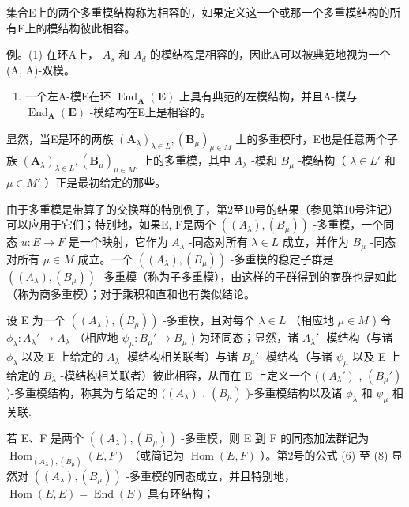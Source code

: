 集合E上的两个多重模结构称为相容的，如果定义这一个或那一个多重模结构的所有E上的模结构彼此相容。

例。(1) 在环A上， \(A_{s}\) 和 \(A_{d}\) 的模结构是相容的，因此A可以被典范地视为一个(A, A)-双模。

\begin{enumerate}
\def\labelenumi{(\arabic{enumi})}
\setcounter{enumi}{1}
\tightlist
\item
  一个左A-模E在环 \(\operatorname{End}_{\mathbf{A}}(\mathbf{E})\) 上具有典范的左模结构，并且A-模与 \(\operatorname{End}_{\mathbf{A}}(\mathbf{E})\) -模结构在E上是相容的。
\end{enumerate}

显然，当E是环的两族 \((\mathbf{A}_{\lambda})_{\lambda\in L},(\mathbf{B}_{\mu})_{\mu\in M}\) 上的多重模时，E也是任意两个子族 \((\mathbf{A}_{\lambda})_{\lambda\in L},(\mathbf{B}_{\mu})_{\mu\in M'}\) 上的多重模，其中 \(A_{\lambda}\) -模和 \(B_{\mu}\) -模结构（ \(\lambda\in L'\) 和 \(\mu\in M'\) ）正是最初给定的那些。

由于多重模是带算子的交换群的特别例子，第2至10号的结果（参见第10号注记）可以应用于它们；特别地，如果E, F是两个 \(((A_{\lambda}), (B_{\mu}))\) -多重模，一个同态 \(u: E \to F\) 是一个映射，它作为 \(A_{\lambda}\) -同态对所有 \(\lambda \in L\) 成立，并作为 \(B_{\mu}\) -同态对所有 \(\mu \in M\) 成立。一个 \(((A_{\lambda}), (B_{\mu}))\) -多重模的稳定子群是 \(((A_{\lambda}), (B_{\mu}))\) -多重模（称为子多重模），由这样的子群得到的商群也是如此（称为商多重模）；对于乘积和直和也有类似结论。

设 E 为一个 \(((A_{\lambda}), (B_{\mu}))\) -多重模，且对每个 \(\lambda \in L\) （相应地 \(\mu \in M\) ) 令 \(\phi_{\lambda}: A_{\lambda}' \to A_{\lambda}\) （相应地 \(\psi_{\mu}: B_{\mu}' \to B_{\mu}\) ) 为环同态；显然，诸 \(A_{\lambda}'\) -模结构（与诸 \(\phi_{\lambda}\) 以及 E 上给定的 \(A_{\lambda}\) -模结构相关联者）与诸 \(B_{\mu}'\) -模结构（与诸 \(\psi_{\mu}\) 以及 E 上给定的 \(B_{\lambda}\) -模结构相关联者）彼此相容，从而在 E 上定义一个 \(((A_{\lambda}')\) , \((B_{\mu}')\) )-多重模结构，称其为与给定的 \(((A_{\lambda})\) , \((B_{\mu})\) )-多重模结构以及诸 \(\phi_{\lambda}\) 和 \(\psi_{\mu}\) 相关联.

若 E、F 是两个 \(((A_{\lambda}), (B_{\mu}))\) -多重模，则 E 到 F 的同态加法群记为 \(\operatorname{Hom}_{(A_{\lambda}), (B_{\mu})}(E, F)\) （或简记为 \(\operatorname{Hom}(E, F)\) ）。第2号的公式 (6) 至 (8) 显然对 \(((A_{\lambda}), (B_{\mu}))\) -多重模的同态成立，并且特别地， \(\operatorname{Hom}(E, E) = \operatorname{End}(E)\) 具有环结构；


